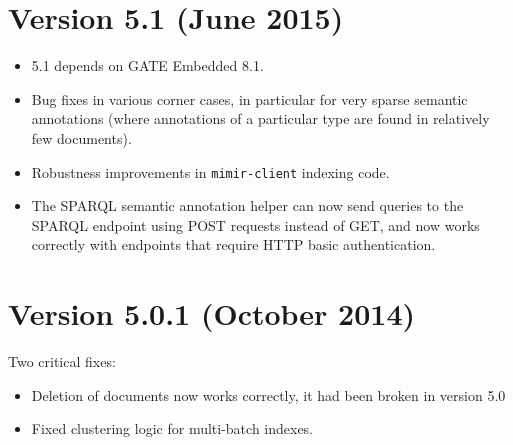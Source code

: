 \section{Version 5.1 (June 2015)}
\begin{itemize}
\item \Mimir{} 5.1 depends on GATE Embedded 8.1.
\item Bug fixes in various corner cases, in particular for very sparse semantic
  annotations (where annotations of a particular type are found in relatively
  few documents).
\item Robustness improvements in \verb!mimir-client! indexing code.
\item The SPARQL semantic annotation helper can now send queries to the SPARQL
  endpoint using POST requests instead of GET, and now works correctly with
  endpoints that require HTTP basic authentication.
\end{itemize}

\section{Version 5.0.1 (October 2014)}
Two critical fixes:
\begin{itemize}
  \item Deletion of documents now works correctly, it had been broken in
  version 5.0
  \item Fixed clustering logic for multi-batch indexes.
\end{itemize}

